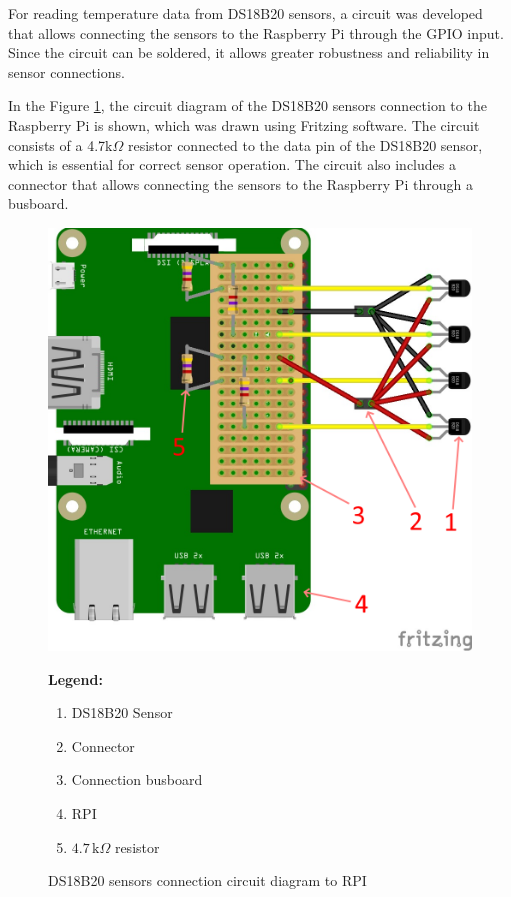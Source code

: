 For reading temperature data from DS18B20 sensors, a circuit was developed that allows connecting the sensors to the Raspberry Pi through the GPIO input. Since the circuit can be soldered, it allows greater robustness and reliability in sensor connections.

In the Figure \ref{fig:circuit_dig}, the circuit diagram of the DS18B20 sensors connection to the Raspberry Pi is shown, which was drawn using Fritzing software. The circuit consists of a 4.7k$\Omega$ resistor connected to the data pin of the DS18B20 sensor, which is essential for correct sensor operation. The circuit also includes a connector that allows connecting the sensors to the Raspberry Pi through a busboard.

\begin{figure}[H]
    \centering
    \begin{minipage}{0.6\textwidth}
        \includegraphics[width=\linewidth]{figures/circuit_dig.png}
    \end{minipage}%
    \hfill
    \begin{minipage}{0.35\textwidth}
        \small
        \textbf{Legend:}
        \begin{enumerate}
            \item DS18B20 Sensor 
            \item Connector
            \item Connection busboard
            \item RPI
            \item $4.7\,\mathrm{k}\Omega$ resistor
        \end{enumerate}
    \end{minipage}
    \caption{DS18B20 sensors connection circuit diagram to RPI}
    \label{fig:circuit_dig}
\end{figure}


